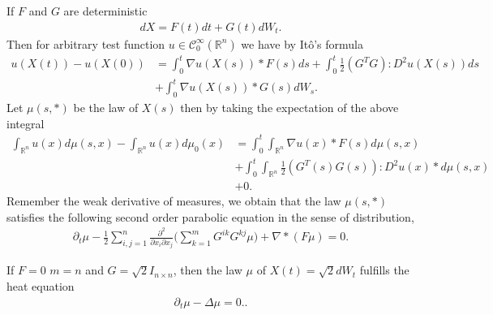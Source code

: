 \begin{remark} 
 If $F$ and $G$ are deterministic 
 \begin{align*}
   dX =  F(t) dt + G(t)dW_t
 .\end{align*}
 Then for arbitrary test function $u \in  \mathcal{C}_0^{\infty}(\mathbb{R}^{n} ) $ we have  by It\^o's formula 
 \begin{align*}
   u(X(t)) - u(X(0)) &= \int_0^{t} \nabla u (X(s)) * F(s) ds + \int_0^{t}  \frac{1}{2}(G^{T}G ) : D^2u(X(s)) ds \\
                     &+ \int_0^{t} \nabla u(X(s)) * G(s) dW_{s} 
 .\end{align*}
 Let $\mu(s,*)$  be the law of $X(s)$ then by taking the expectation of the above integral 
 \begin{align*}
   \int_{\mathbb{R}^{n} } u(x) d\mu(s,x) - \int_{\mathbb{R}^{n} } u(x) d\mu_0(x) &=  \int_{0}^{t} \int_{\mathbb{R}^{n} }  \nabla u(x) * F(s) d\mu(s,x)\\
     &+ \int_0^{t} \int_{\mathbb{R}^{n} }  \frac{1}{2}(G^{T}(s)G(s)) : D^2 u(x) * d\mu (s,x) \\
                                                                                 &+ 0
 .\end{align*}
 Remember the weak derivative of measures, we obtain that the law $\mu(s,*)$ satisfies the following second order parabolic equation in the sense of distribution,
 \begin{align*}
   \partial_t \mu  - \frac{1}{2} \sum_{i,j=1}^{n}  \frac{\partial^2}{\partial x_i\partial x_j} \Big(\sum_{k=1}^{m}  G^{ik}G^{kj}  \mu\Big)  + \nabla * (F \mu )  = 0 
 .\end{align*} 
\end{remark}
\begin{example}
  If $F=0$  $m=n$ and $G=\sqrt{2}I_{n \times  n} $, then the law $\mu $ of $X(t)=\sqrt{2} dW_t $ fulfills the heat equation 
  \begin{align*}
    \partial_t{\mu}- \Delta \mu  = 0.
  .\end{align*}
\end{example}
